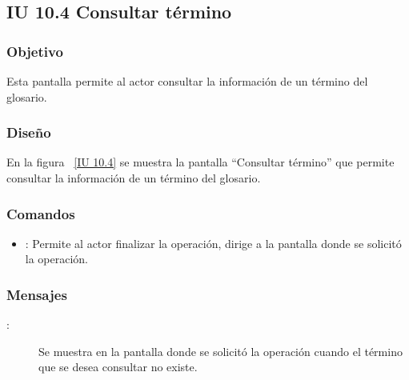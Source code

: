 \newpage 
\subsection{IU 10.4 Consultar término}

\subsubsection{Objetivo}
	
	Esta pantalla permite al actor consultar la información de un término del glosario.

\subsubsection{Diseño}

    En la figura ~\ref{IU 10.4} se muestra la pantalla ``Consultar término'' que permite consultar la información de un término del glosario. \\



\subsubsection{Comandos}
\begin{itemize}
	\item {}: Permite al actor finalizar la operación, dirige a la pantalla donde se solicitó la operación.
\end{itemize}

\subsubsection{Mensajes}
	
\begin{description}
	\item[:] Se muestra en la pantalla donde se solicitó la operación cuando el término que se desea consultar no existe.
\end{description}
